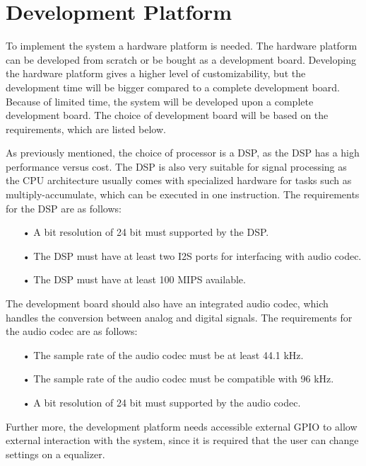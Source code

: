 \chapter{Development Platform}

To implement the system a hardware platform is needed. The hardware platform can be developed from scratch or be bought as a development board. Developing the hardware platform gives a higher level of customizability, but the development time will be bigger compared to a complete development board. Because of limited time, the system will be developed upon a complete development board. The choice of development board will be based on the requirements, which are listed below.

As previously mentioned, the choice of processor is a DSP, as the DSP has a high performance versus cost. The DSP is also very suitable for signal processing as the CPU architecture usually comes with specialized hardware for tasks such as multiply-accumulate, which can be executed in one instruction. The requirements for the DSP are as follows:

\begin{enumerate}
\item[•] A bit resolution of 24 bit must supported by the DSP.\\
\item[•] The DSP must have at least two I2S ports for interfacing with audio codec.\\
\item[•] The DSP must have at least 100 MIPS available.
\end{enumerate}

The development board should also have an integrated audio codec, which handles the conversion between analog and digital signals. The requirements for the audio codec are as follows:

\begin{enumerate}
\item[•] The sample rate of the audio codec must be at least 44.1 kHz.\\
\item[•] The sample rate of the audio codec must be compatible with 96 kHz.\\
\item[•] A bit resolution of 24 bit must supported by the audio codec.\\
\end{enumerate}

Further more, the development platform needs accessible external GPIO to allow external interaction with the system, since it is required that the user can change settings on a equalizer. 


